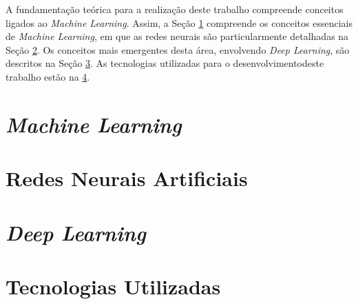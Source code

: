 
A fundamentação teórica para a realização deste trabalho compreende conceitos ligados ao \emph{Machine Learning}. Assim, a Seção \ref{sec:machineLearning} compreende os conceitos essenciais de \emph{Machine Learning}, em que as redes neurais são particularmente detalhadas na Seção \ref{sec:rnas}. Os conceitos mais emergentes desta área, envolvendo \emph{Deep Learning}, são descritos na Seção \ref{sec:dl}. As tecnologias utilizadas para o desenvolvimentodeste trabalho estão na \ref{sec:tecs}.

\section{\emph{Machine Learning}} \label{sec:machineLearning}


\section{Redes Neurais Artificiais} \label{sec:rnas}


\section{\emph{Deep Learning}}\label{sec:dl}


\section{Tecnologias Utilizadas}\label{sec:tecs}

